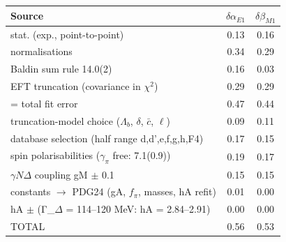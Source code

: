 \begin{tabular}{lcc}
\hline
Source & $\delta\alpha_{E1}$ & $\delta\beta_{M1}$ \\
\hline
stat. (exp., point-to-point) & 0.13 & 0.16 \\
normalisations & 0.34 & 0.29 \\
Baldin sum rule 14.0(2) & 0.16 & 0.03 \\
EFT truncation (covariance in $\chi^2$) & 0.29 & 0.29 \\
= total fit error & 0.47 & 0.44 \\
truncation-model choice ($\Lambda_b$, $\delta$, $\bar c$, $\ell$) & 0.09 & 0.11 \\
database selection (half range d,d',e,f,g,h,F4) & 0.17 & 0.15 \\
spin polarisabilities ($\gamma_\pi$ free: 7.1(0.9)) & 0.19 & 0.17 \\
$\gamma N\Delta$ coupling gM $\pm$ 0.1 & 0.15 & 0.15 \\
constants $\to$ PDG24 (gA, $f_\pi$, masses, hA refit) & 0.01 & 0.00 \\
hA $\pm$ (Γ\_$\Delta$ = 114–120 MeV: hA = 2.84–2.91) & 0.00 & 0.00 \\
TOTAL & 0.56 & 0.53 \\
\hline
\end{tabular}

